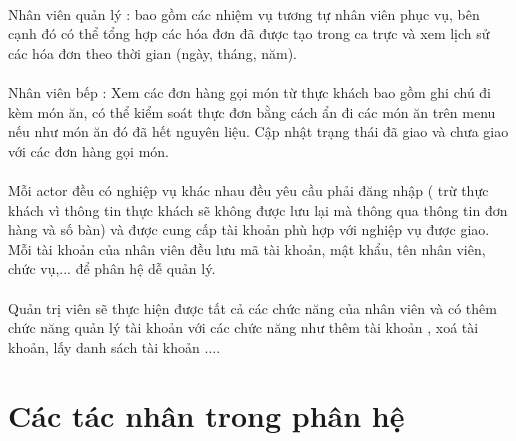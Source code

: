 \documentclass{report}
\begin{document}
 	\paragraph{}
	Nhân viên quản lý : bao gồm các nhiệm vụ tương tự nhân viên phục vụ, bên cạnh đó có thể tổng hợp các hóa đơn đã được tạo trong ca trực và xem lịch sử các hóa đơn theo thời gian (ngày, tháng, năm).
        \paragraph{}
	Nhân viên bếp : Xem các đơn hàng gọi món từ thực khách bao gồm ghi chú đi kèm món ăn, có thể kiểm soát thực đơn bằng cách ẩn đi các món ăn trên menu nếu như món ăn đó đã hết nguyên liệu. Cập nhật trạng thái đã giao và chưa giao với các đơn hàng gọi món.
	\paragraph{}
	Mỗi actor đều có nghiệp vụ khác nhau đều yêu cầu phải đăng nhập ( trừ thực khách vì thông tin thực khách sẽ không được lưu lại mà thông qua thông tin đơn hàng và số bàn) và được cung cấp tài khoản phù hợp với nghiệp vụ được giao. Mỗi tài khoản của nhân viên đều lưu mã tài khoản, mật khẩu, tên nhân viên, chức vụ,... để phân hệ dễ quản lý.
	\paragraph{}
	Quản trị viên sẽ thực hiện được tất cả các chức năng của nhân viên và có thêm chức năng quản lý tài khoản với các chức năng như thêm tài khoản , xoá tài khoản, lấy danh sách tài khoản ....
\pagebreak

\section{Các tác nhân trong phân hệ}
\FloatBarrier
\end{document}
